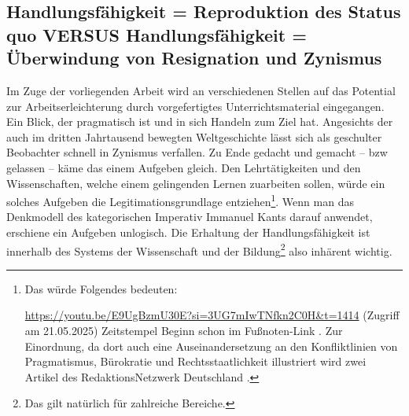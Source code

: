 


\subsection{Handlungsfähigkeit = Reproduktion des Status quo VERSUS Handlungsfähigkeit = Überwindung von Resignation und Zynismus}
Im Zuge der vorliegenden Arbeit wird an verschiedenen Stellen auf das Potential zur Arbeitserleichterung durch vorgefertigtes Unterrichtsmaterial eingegangen. Ein Blick, der pragmatisch ist und in sich Handeln zum Ziel hat. Angesichts der auch im dritten Jahrtausend bewegten Weltgeschichte lässt sich als geschulter Beobachter schnell in Zynismus verfallen. Zu Ende gedacht und gemacht -- \gls{bzw} gelassen -- käme das einem Aufgeben gleich. Den Lehrtätigkeiten und den Wissenschaften, welche einem gelingenden Lernen zuarbeiten sollen, würde ein solches Aufgeben die Legitimationsgrundlage entziehen\footnote{
    Das würde Folgendes bedeuten: 

    \url{https://youtu.be/E9UgBzmU30E?si=3UG7mIwTNfkn2C0H&t=1414} (Zugriff am 21.05.2025) Zeitstempel Beginn schon im Fußnoten-Link \autocite[][Als Meme von $23^{\prime}34^{\prime\prime}$ bis $23^{\prime}50^{\prime\prime}$ schauen]{Wolle}. Zur Einordnung, da dort auch %
    eine Auseinandersetzung an den Konfliktlinien von Pragmatismus, Bürokratie und Rechtsstaatlichkeit illustriert wird zwei Artikel des RedaktionsNetzwerk Deutschland \autocites{Schwarzer.05.02.2021}{Schwarzer.08.02.2021}.
}. Wenn man das Denkmodell des kategorischen Imperativ Immanuel Kants darauf anwendet, erschiene ein Aufgeben unlogisch. Die Erhaltung der Handlungsfähigkeit ist innerhalb des Systems der Wissenschaft und der Bildung\footnote{
    Das gilt natürlich für zahlreiche Bereiche. 
} also inhärent wichtig. 


